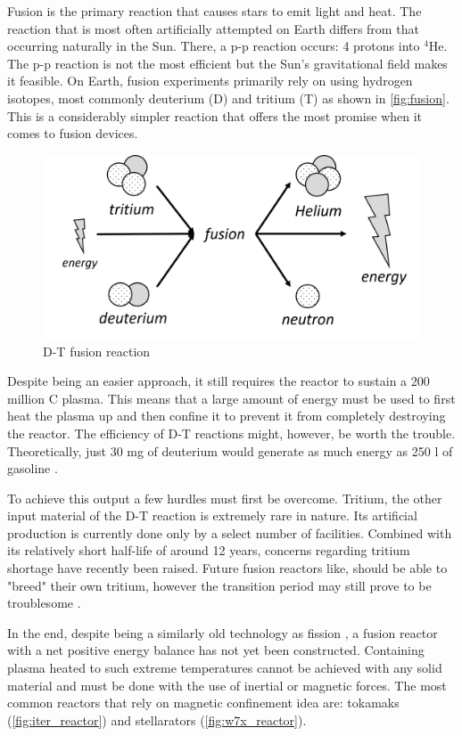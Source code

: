   Fusion is the primary reaction that causes stars to emit light and heat.
  The reaction that is most often artificially attempted on Earth differs
  from that occurring naturally in the Sun. There, a p-p reaction occurs:
  4 protons into ${}^{4}$He. The p-p reaction is not the most efficient but
  the Sun's gravitational field makes it feasible.
  On Earth, fusion experiments primarily rely on using hydrogen isotopes, 
  most commonly deuterium (D) and tritium (T) as shown in \autoref{fig:fusion}.
  This is a considerably simpler reaction that offers the most promise
  when it comes to fusion devices.

  \begin{figure}[H]
	\centering
	\includegraphics[width=.75\linewidth]{media/fusion.png}
	\caption{D-T fusion reaction}
	\label{fig:fusion}
  \end{figure}

  Despite being an easier approach, it still requires the reactor to sustain
  a 200 million \degree C plasma. This means that a large amount of energy
  must be used to first heat the plasma up and then confine it to 
  prevent it from completely destroying the reactor. 
  The efficiency of D-T reactions might, however, be worth the trouble.
  Theoretically, just 30 mg of deuterium would generate as much energy
  as 250 l of gasoline \cite{nuclear_fusion_status}. 


  To achieve this output a few hurdles must first be overcome.
  Tritium, the other input material of the D-T reaction is
  extremely rare in nature. Its artificial production is currently 
  done only by a select number of facilities. 
  Combined with its relatively short half-life of around 12 years, 
  concerns regarding tritium shortage have recently been raised.
  Future fusion reactors like, should be able to "breed" their own tritium,
  however the transition period 
  may still prove to be troublesome \cite{fusion_fuel_running_out}.


  In the end, despite being a similarly old technology as fission
  \cite{fusion_history},
  a fusion reactor with a net positive energy balance
  has not yet been constructed. Containing plasma heated to such extreme
  temperatures cannot be achieved with any solid material and must 
  be done with the use of inertial or magnetic forces. 
  The most common reactors that rely on magnetic confinement idea are:
  tokamaks (\autoref{fig:iter_reactor}) 
  and stellarators (\autoref{fig:w7x_reactor}).
  \cite{tokamak_vs_stellarator}


